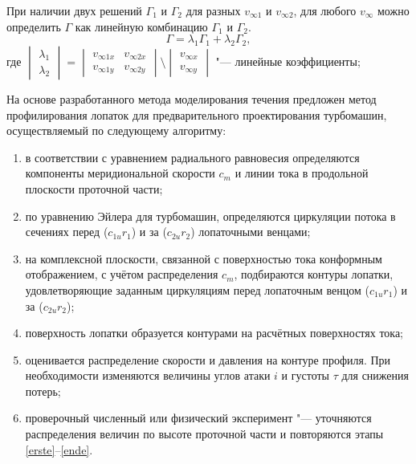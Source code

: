 При наличии двух решений \(\Gamma_{1}\) и \(\Gamma_2\) для разных \(v_{\infty 1}\) и \(v_{\infty 2}\), для любого \(v_{\infty}\) можно определить \(\Gamma\) как линейную комбинацию \(\Gamma_{1}\) и \(\Gamma_2\).
	\[\Gamma = \lambda_1 \Gamma_1 + \lambda_2	\Gamma_2,\]
где	\(
		\begin{vmatrix}
			\lambda_1 \\ \lambda_2
		\end{vmatrix}
		=
	\begin{vmatrix}
		v_{\infty 1 x} & v_{\infty 2 x} \\
		v_{\infty 1 y} & v_{\infty 2 y}
	\end{vmatrix}
	\setminus
	\begin{vmatrix}
		v_{\infty x} \\ v_{\infty y}
	\end{vmatrix}
	\) "--- линейные коэффициенты;

На основе разработанного метода моделирования течения предложен метод профилирования лопаток для предварительного проектирования турбомашин, осуществляемый по следующему алгоритму:
\begin{enumerate}
	\item \label{erste} в соответствии с уравнением радиального равновесия определяются компоненты меридиональной скорости \(c_m\) и линии тока в продольной плоскости проточной части;
	\item по уравнению Эйлера для турбомашин, определяются циркуляции потока в сечениях перед (\(c_{1u} r_1\)) и за (\(c_{2u} r_2\)) лопаточными венцами;
	\item на комплексной плоскости, связанной с поверхностью тока конформным отображением, с учётом распределения \(c_m\), подбираются контуры лопатки, удовлетворяющие заданным циркуляциям перед лопаточным венцом (\(c_{1u} r_1\)) и за (\(c_{2u} r_2\));
	\item поверхность лопатки образуется контурами на расчётных поверхностях тока;
	\item \label{ende} оценивается распределение скорости и давления на контуре профиля. При необходимости изменяются величины углов атаки \(i\) и густоты \(\tau\) для снижения  потерь;
	\item проверочный численный или физический эксперимент "--- уточняются распределения величин по высоте проточной части и повторяются этапы \ref{erste}--\ref{ende}.
\end{enumerate}

